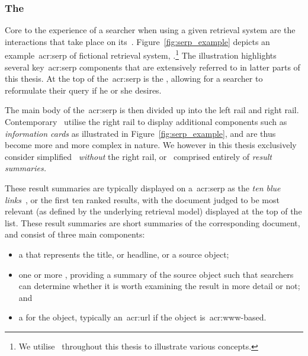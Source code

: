 \subsubsection{The~}\label{sec:ir_background:user:iir:serp}
Core to the experience of a searcher when using a given retrieval system are the interactions that take place on its~. Figure~\ref{fig:serp_example} depicts an example~\gls{acr:serp} of fictional retrieval system, \searchlogo.\footnote{We utilise \searchlogo~throughout this thesis to illustrate various concepts.} The illustration highlights several key~\gls{acr:serp} components that are extensively referred to in latter parts of this thesis. At the top of the~\gls{acr:serp} is the , allowing for a searcher to reformulate their query if he or she desires.

The main body of the~\gls{acr:serp} is then divided up into the left rail and right rail. Contemporary~ utilise the right rail to display additional components such as \emph{information cards} as illustrated in Figure~\ref{fig:serp_example}, and are thus become more and more complex in nature. We however in this thesis exclusively consider simplified~ \emph{without} the right rail, or~ comprised entirely of \emph{result summaries.}

These result summaries are typically displayed on a~\gls{acr:serp} as the \emph{ten blue links}~\citep{hearst2009_search}, or the first ten ranked results, with the document judged to be most relevant (as defined by the underlying retrieval model) displayed at the top of the list. These result summaries are short summaries of the corresponding document, and consist of three main components:

\begin{itemize}
    \item{a  that represents the title, or headline, or a source object;}
    \item{one or more , providing a summary of the source object such that searchers can determine whether it is worth examining the result in more detail or not; and}
    \item{a  for the object, typically an~\gls{acr:url} if the object is~\gls{acr:www}-based.}
\end{itemize}

